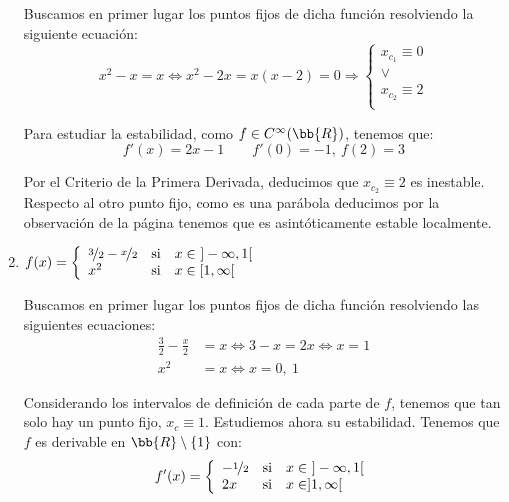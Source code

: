 \begin{ejercicio}
\begin{enumerate}
        Buscamos en primer lugar los puntos fijos de dicha función resolviendo la siguiente ecuación:
        \begin{equation*}
            x^2-x = x \Longleftrightarrow x^2-2x = x(x-2) = 0 \Longrightarrow \left\{\begin{array}{c}
                x_{c_1} \equiv 0 \\
                \lor\\
                x_{c_2} \equiv 2 \\
            \end{array}\right.
        \end{equation*}
        
        Para estudiar la estabilidad, como $f\in  C^\infty(\bb{R})$, tenemos que:
        \begin{equation*}
            f'(x)=2x-1 \qquad f'(0)=-1,~f(2)=3
        \end{equation*}

        Por el Criterio de la Primera Derivada, deducimos que $x_{c_2}\equiv 2$ es inestable. Respecto al otro punto fijo, como es una parábola deducimos por la observación de la página \pageref{obs:polinomio2grado} tenemos que es asintóticamente estable localmente.
        
        \item $f(x)=\left\{\begin{array}{lll}
            \nicefrac{3}{2} - \nicefrac{x}{2} & \text{si} & x\in~]-\infty, 1[ \\
            x^2 & \text{si} & x\in [1,\infty[
        \end{array}\right.$

        Buscamos en primer lugar los puntos fijos de dicha función resolviendo las siguientes ecuaciones:
        \begin{align*}
            \frac{3}{2}-\frac{x}{2} &= x \Longleftrightarrow 3-x = 2x \Longleftrightarrow x=1\\
            x^2 &= x \Longleftrightarrow x=0,~1
        \end{align*}

        Considerando los intervalos de definición de cada parte de $f$, tenemos que tan solo hay un punto fijo, $x_c\equiv 1$. Estudiemos ahora su estabilidad. Tenemos que $f$ es derivable en $\bb{R}\setminus \{1\}$ con:
        \begin{equation*}
            f'(x)=\left\{\begin{array}{lll}
            - \nicefrac{1}{2} & \text{si} & x\in~]-\infty, 1[ \\
            2x & \text{si} & x\in ]1,\infty[
        \end{array}\right.
        \end{equation*}


\end{enumerate}
\end{ejercicio}
